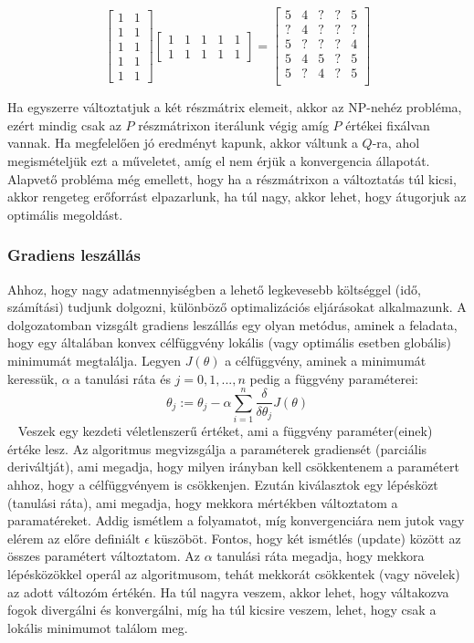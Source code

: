 \documentclass[a4paper,12pt]{article}
\begin{document}
\[
\begin{bmatrix}
    1 & 1 \\
    1 & 1  \\
    1 & 1  \\
    1 & 1  \\
    1 & 1          
\end{bmatrix}
%
\begin{bmatrix}
    1 & 1 & 1 & 1 & 1 \\
    1 & 1 & 1 & 1 & 1        
\end{bmatrix}
=
\begin{bmatrix}
    5 & 4 & ? & ? & 5\\
	? & 4 & ? & ? & ?\\
	5 & ? & ? & ? & 4\\
	5 & 4 & 5 & ? & 5\\
	5 & ? & 4 & ? & 5\\\end{bmatrix}
\] \linebreak

Ha egyszerre változtatjuk a két részmátrix elemeit, akkor az NP-nehéz probléma, ezért mindig csak az $P$ részmátrixon iterálunk végig amíg $P$ értékei fixálvan vannak. Ha megfelelően jó eredményt kapunk, akkor váltunk a $Q$-ra, ahol megismételjük ezt a műveletet, amíg el nem érjük a konvergencia állapotát. Alapvető probléma még emellett, hogy ha a részmátrixon a változtatás túl kicsi, akkor rengeteg erőforrást elpazarlunk, ha túl nagy, akkor lehet, hogy átugorjuk az optimális megoldást.

\subsubsection{Gradiens leszállás}

Ahhoz, hogy nagy adatmennyiségben a lehető legkevesebb költséggel (idő, számítási) tudjunk dolgozni, különböző optimalizációs eljárásokat alkalmazunk. A dolgozatomban vizsgált gradiens leszállás egy olyan metódus, aminek a feladata, hogy egy általában konvex célfüggvény lokális (vagy optimális esetben globális) minimumát megtalálja. Legyen $J(\theta)$ a célfüggvény, aminek a minimumát keressük, $\alpha$ a tanulási ráta és $j=0, 1, ..., n$ pedig a függvény paraméterei:
\[\theta_j:=\theta_j-\alpha\sum\limits_{i=1}^n\frac{\delta}{\delta\theta_j}J(\theta)\]~\cite{andrewml}
Veszek egy kezdeti véletlenszerű értéket, ami a függvény paraméter(einek) értéke lesz. Az algoritmus megvizsgálja a paraméterek gradiensét (parciális deriváltját), ami megadja, hogy milyen irányban kell csökkentenem a paramétert ahhoz, hogy a célfüggvényem is csökkenjen. Ezután kiválasztok egy lépésközt (tanulási ráta), ami megadja, hogy mekkora mértékben változtatom a paramatéreket. Addig ismétlem a folyamatot, míg konvergenciára nem jutok vagy elérem az előre definiált $\epsilon$ küszöböt. Fontos, hogy két ismétlés (update) között az összes paramétert változtatom. \linebreak
Az $\alpha$ tanulási ráta megadja, hogy mekkora lépésközökkel operál az algoritmusom, tehát mekkorát csökkentek (vagy növelek) az adott változóm értékén. Ha túl nagyra veszem, akkor lehet, hogy váltakozva fogok divergálni és konvergálni, míg ha túl kicsire veszem, lehet, hogy csak a lokális minimumot találom meg.
\end{document}
